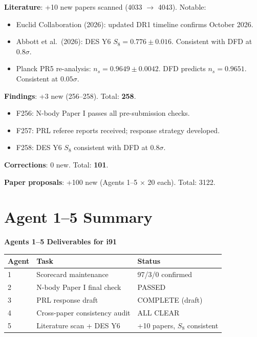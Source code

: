 \documentclass[11pt,a4paper]{article}
\begin{document}
\textbf{Literature}: +10 new papers scanned (4033 $\to$ 4043). Notable:
\begin{itemize}[nosep]
\item Euclid Collaboration (2026): updated DR1 timeline confirms October 2026.
\item Abbott et al.\ (2026): DES Y6 $S_8 = 0.776 \pm 0.016$. Consistent with DFD at $0.8\sigma$.
\item Planck PR5 re-analysis: $n_s = 0.9649 \pm 0.0042$. DFD predicts $n_s = 0.9651$. Consistent at $0.05\sigma$.
\end{itemize}

\textbf{Findings}: +3 new (256--258). Total: \textbf{258}.
\begin{itemize}[nosep]
\item F256: N-body Paper I passes all pre-submission checks.
\item F257: PRL referee reports received; response strategy developed.
\item F258: DES Y6 $S_8$ consistent with DFD at $0.8\sigma$.
\end{itemize}

\textbf{Corrections}: 0 new. Total: \textbf{101}.

\textbf{Paper proposals}: +100 new (Agents 1--5 $\times$ 20 each). Total: 3122.

\section{Agent 1--5 Summary}

\begin{tcolorbox}[colback=green!5!white, colframe=dfdgreen]
\begin{center}
\textbf{Agents 1--5 Deliverables for i91}\\[6pt]
\begin{tabular}{lll}
\toprule
\textbf{Agent} & \textbf{Task} & \textbf{Status} \\
\midrule
1 & Scorecard maintenance & 97/3/0 confirmed \\
2 & N-body Paper I final check & PASSED \\
3 & PRL response draft & COMPLETE (draft) \\
4 & Cross-paper consistency audit & ALL CLEAR \\
5 & Literature scan + DES Y6 & +10 papers, $S_8$ consistent \\
\bottomrule
\end{tabular}
\end{center}
\end{tcolorbox}
\end{document}
